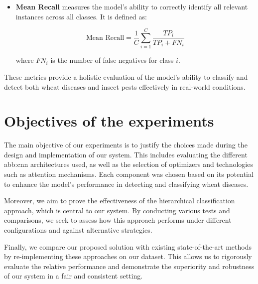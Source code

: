 \begin{itemize}
    \begin{equation}
        \text{Mean Precision} = \frac{1}{C} \sum_{i=1}^{C} \frac{TP_i}{TP_i + FP_i}
    \end{equation}

    where $TP_i$ and $FP_i$ denote the number of true positives and false positives for class $i$, respectively.

    \item \textbf{Mean Recall} measures the model’s ability to correctly identify all relevant instances across all classes. It is defined as:

    \begin{equation}
        \text{Mean Recall} = \frac{1}{C} \sum_{i=1}^{C} \frac{TP_i}{TP_i + FN_i}
    \end{equation}

    where $FN_i$ is the number of false negatives for class $i$.
    
\end{itemize}


These metrics provide a holistic evaluation of the model's ability to classify and detect both wheat diseases and insect pests effectively in real-world conditions.



\section{Objectives of the experiments}

The main objective of our experiments is to justify the choices made during the design and implementation of our system. This includes evaluating the different \gls{abb:cnn} architectures used, as well as the selection of optimizers and technologies such as attention mechanisms. Each component was chosen based on its potential to enhance the model’s performance in detecting and classifying wheat diseases.

Moreover, we aim to prove the effectiveness of the hierarchical classification approach, which is central to our system. By conducting various tests and comparisons, we seek to assess how this approach performs under different configurations and against alternative strategies.

Finally, we compare our proposed solution with existing state-of-the-art methods by re-implementing these approaches on our dataset. This allows us to rigorously evaluate the relative performance and demonstrate the superiority and robustness of our system in a fair and consistent setting.



